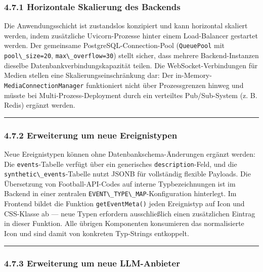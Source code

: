 \subsubsection{4.7.1 Horizontale Skalierung des
Backends}\label{horizontale-skalierung-des-backends}

Die Anwendungsschicht ist zustandslos konzipiert und kann horizontal
skaliert werden, indem zusätzliche Uvicorn-Prozesse hinter einem
Load-Balancer gestartet werden. Der gemeinsame
PostgreSQL-Connection-Pool (\passthrough{\lstinline!QueuePool!} mit
\passthrough{\lstinline!pool\_size=20!},
\passthrough{\lstinline!max\_overflow=30!}) stellt sicher, dass mehrere
Backend-Instanzen dieselbe Datenbankverbindungskapazität teilen. Die
WebSocket-Verbindungen für Medien stellen eine Skalierungseinschränkung
dar: Der in-Memory-\passthrough{\lstinline!MediaConnectionManager!}
funktioniert nicht über Prozessgrenzen hinweg und müsste bei
Multi-Prozess-Deployment durch ein verteiltes Pub/Sub-System (z. B.
Redis) ergänzt werden.

\begin{center}\rule{0.5\linewidth}{0.5pt}\end{center}

\subsubsection{4.7.2 Erweiterung um neue
Ereignistypen}\label{erweiterung-um-neue-ereignistypen}

Neue Ereignistypen können ohne Datenbankschema-Änderungen ergänzt
werden: Die \passthrough{\lstinline!events!}-Tabelle verfügt über ein
generisches \passthrough{\lstinline!description!}-Feld, und die
\passthrough{\lstinline!synthetic\_events!}-Tabelle nutzt JSONB für
vollständig flexible Payloads. Die Übersetzung von Football-API-Codes
auf interne Typbezeichnungen ist im Backend in einer zentralen
\passthrough{\lstinline!EVENT\_TYPE\_MAP!}-Konfiguration hinterlegt. Im
Frontend bildet die Funktion \passthrough{\lstinline!getEventMeta()!}
jeden Ereignistyp auf Icon und CSS-Klasse ab --- neue Typen erfordern
ausschließlich einen zusätzlichen Eintrag in dieser Funktion. Alle
übrigen Komponenten konsumieren das normalisierte Icon und sind damit
von konkreten Typ-Strings entkoppelt.

\begin{center}\rule{0.5\linewidth}{0.5pt}\end{center}

\subsubsection{4.7.3 Erweiterung um neue
LLM-Anbieter}\label{erweiterung-um-neue-llm-anbieter}

